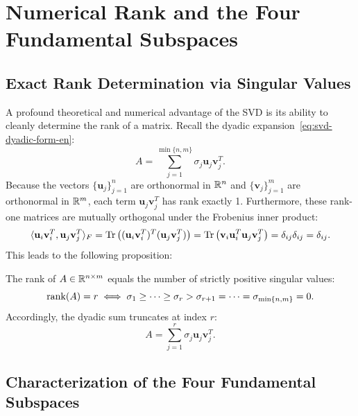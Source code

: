 \section{Numerical Rank and the Four Fundamental Subspaces}
\label{sec:svd-four-subspaces-en}

\subsection{Exact Rank Determination via Singular Values}

A profound theoretical and numerical advantage of the SVD is its ability to cleanly determine the rank of a matrix.
Recall the dyadic expansion~\eqref{eq:svd-dyadic-form-en}:
\begin{equation}
    A = \sum_{j=1}^{\min\{n, m\}} \sigma_j \mathbf{u}_j \mathbf{v}_j^T.
\end{equation}
Because the vectors $\{\mathbf{u}_j\}_{j=1}^n$ are orthonormal in $\mathbb{R}^n$ and $\{\mathbf{v}_j\}_{j=1}^m$ are orthonormal in $\mathbb{R}^m$, each term $\mathbf{u}_j \mathbf{v}_j^T$ has rank exactly 1. Furthermore, these rank-one matrices are mutually orthogonal under the Frobenius inner product:
\begin{equation}
    \langle \mathbf{u}_i \mathbf{v}_i^T, \mathbf{u}_j \mathbf{v}_j^T \rangle_F = \operatorname{Tr}\left( (\mathbf{u}_i \mathbf{v}_i^T)^T (\mathbf{u}_j \mathbf{v}_j^T) \right) = \operatorname{Tr}\left( \mathbf{v}_i \mathbf{u}_i^T \mathbf{u}_j \mathbf{v}_j^T \right) = \delta_{ij} \delta_{ij} = \delta_{ij}.
\end{equation}
This leads to the following proposition:

\begin{proposition}
The rank of $A \in \mathbb{R}^{n \times m}$ equals the number of strictly positive singular values:
\begin{equation}
    \operatorname{rank}(A) = r \iff \sigma_1 \ge \dots \ge \sigma_r > \sigma_{r+1} = \dots = \sigma_{\min\{n, m\}} = 0.
\end{equation}
Accordingly, the dyadic sum truncates at index $r$:
\begin{equation}
    A = \sum_{j=1}^r \sigma_j \mathbf{u}_j \mathbf{v}_j^T.
\end{equation}
\end{proposition}

\subsection{Characterization of the Four Fundamental Subspaces}

